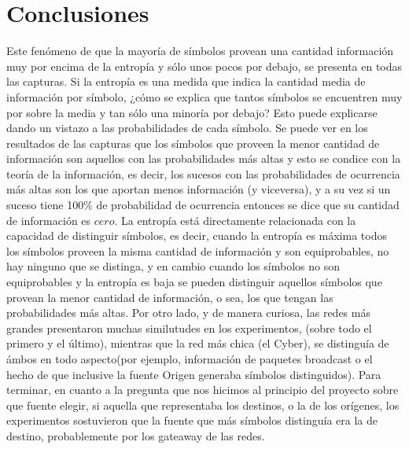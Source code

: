 \section{Conclusiones}

Este fenómeno de que la mayoría de símbolos provean una cantidad información muy por encima de la entropía y sólo unos pocos por debajo, se presenta en todas las capturas. Si la entropía es una medida que indica la cantidad media de información por símbolo, ¿cómo se explica que tantos símbolos se encuentren muy por sobre la media y tan sólo una minoría por debajo? Esto puede explicarse dando un vistazo a las probabilidades de cada símbolo. Se puede ver en los resultados de las capturas que los símbolos que proveen la menor cantidad de información son aquellos con las probabilidades más altas y esto se condice con la teoría de la información, es decir, los sucesos con las probabilidades de ocurrencia más altas son los que aportan menos información (y viceversa), y a su vez si un suceso tiene 100\% de probabilidad de ocurrencia entonces se dice que su cantidad de información es $cero$. La entropía está directamente relacionada con la capacidad de distinguir símbolos, es decir, cuando la entropía es máxima todos los símbolos proveen la misma cantidad de información y son equiprobables, no hay ninguno que se distinga, y en cambio cuando los símbolos no son equiprobables y la entropía es baja se pueden distinguir aquellos símbolos que provean la menor cantidad de información, o sea, los que tengan las probabilidades más altas.
 Por otro lado, y de manera curiosa, las redes más grandes presentaron muchas similutudes en los experimentos, (sobre todo el primero y el último), mientras que la red más chica (el Cyber), se distinguía de ámbos en todo aspecto(por ejemplo, información de paquetes broadcast o el hecho de que inclusive la fuente Origen generaba símbolos distinguidos).
 Para terminar, en cuanto a la pregunta que nos hicimos al principio del proyecto sobre que fuente elegir, si aquella que representaba los destinos, o la de los orígenes, los experimentos sostuvieron que la fuente que más símbolos distinguía era la de destino, probablemente por los gateaway de las redes.